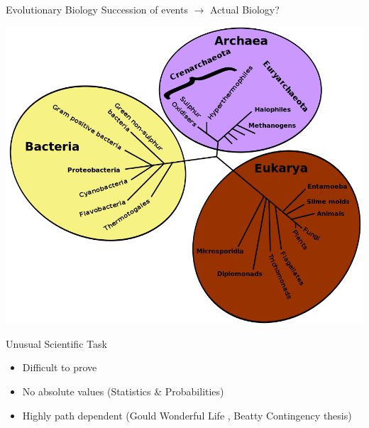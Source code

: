\documentclass[12pt, notes=show,handout=no]{beamer}
\begin{document}
\begin{frame}{Evolutionary Biology}
Succession of events $\rightarrow$ Actual Biology?
	\begin{center}
	    \includegraphics[width=.8\textheight]{images/treeOfLife.png}
	\end{center}
\end{frame}
\begin{frame}{Unusual Scientific Task}
    \vfill
    \begin{itemize}
	\item Difficult to prove
	    \vfill
	\item No absolute values (Statistics \& Probabilities)
	    \vfill
	\item  Highly path dependent (Gould Wonderful Life , Beatty Contingency thesis)
    \end{itemize}
    \vfill
\end{frame}
\end{document}
